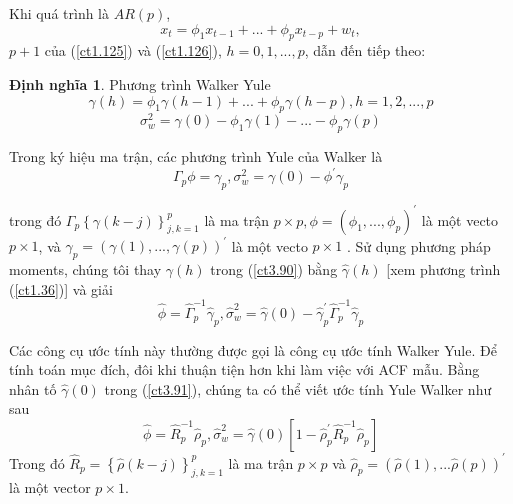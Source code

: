 \documentclass[12pt, a4paper,oneside]{book}
\theoremstyle{definition}
\newtheorem{dn}[theo]{Định nghĩa}
\begin{document}
Khi quá trình là $ AR(p) $, 
$$x_{t}=\phi_{1}x_{t-1}+...+\phi_{p}x_{t-p}+w_{t},$$
$ p + 1 $ của (\ref{ct1.125}) và (\ref{ct1.126}), $ h = 0, 1 ,..., p $, dẫn đến
tiếp theo:
\begin{dn}
	Phương trình Walker Yule
	\begin{equation}
	\gamma(h)=\phi_{1}\gamma (h-1)+...+\phi_{p}\gamma (h-p) , h = 1, 2 ,. . . , p \label{ct3.88}
	\end{equation}
	\begin{equation}
	\sigma_{w}^2=\gamma(0) - \phi_{1}\gamma(1)-...-\phi_{p}\gamma(p)  \label{ct3.89}
	\end{equation}	
\end{dn}
Trong ký hiệu ma trận, các phương trình Yule của Walker là
\begin{equation}
\Gamma_{p}\phi=\gamma_{p}, \sigma_{w}^2=\gamma(0)-\phi^{'}\gamma_{p} \label{ct3.90}
\end{equation}

trong đó $ \Gamma_{p}\left\lbrace \gamma(k-j)\right\rbrace_{j,k=1}^p  $ là ma trận $ p \times p, \phi=(\phi_{1},...,\phi_{p})^{'} $ là một vecto $ p \times 1 $, và $ \gamma_{p}=(\gamma(1),...,\gamma(p))^{'} $ là một vecto $ p\times1 $ . Sử dụng phương pháp moments, chúng tôi thay $ \gamma(h) $ trong (\ref{ct3.90}) bằng $ \hat{\gamma}(h) $  [xem phương trình (\ref{ct1.36})] và giải
\begin{equation}
\hat{\phi}=\hat{\Gamma}_{p}^{-1}\hat{\gamma}_{p},  \hat{\sigma}_{w}^2=\hat{\gamma}(0)-\hat{\gamma}^{'}_{p}\hat{\Gamma}^{-1}_{p}\hat{\gamma}_{p} \label{ct3.91}
\end{equation}

Các công cụ ước tính này thường được gọi là công cụ ước tính Walker Yule. Để tính toán mục đích, đôi khi thuận tiện hơn khi làm việc với ACF mẫu.
Bằng nhân tố $ \hat{\gamma}(0) $ trong (\ref{ct3.91}), chúng ta có thể viết ước tính Yule Walker như sau
\begin{equation}
\hat{\phi}=\hat{R}_{p}^{-1}\hat{\rho}_{p}, \hat{\sigma}_{w}^{2}=\hat{\gamma}(0)[1-\hat{\rho}_{p}^{'} \hat{R}_{p}^{-1}\hat{\rho}_{p}] \label{ct3.92}
\end{equation}
Trong đó $ \hat{R}_{p}=\left\lbrace\hat{\rho}(k-j)\right\rbrace _{j,k=1}^p  $ là ma trận $p\times p$ và $\hat{\rho}_{p}=(\hat{\rho}(1),...\hat{\rho}(p))^{\prime}  $ là một vector $ p\times 1 $.
\end{document}
